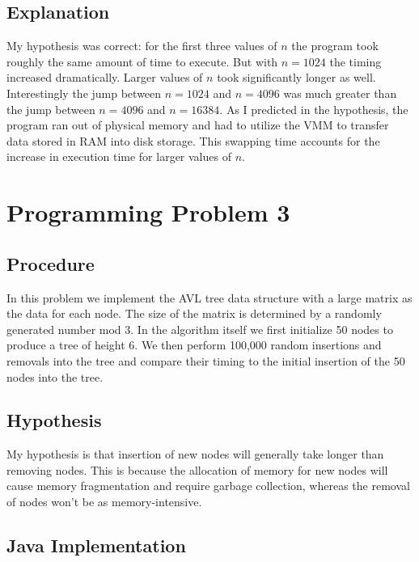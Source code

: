 \documentclass[11pt]{article}
\begin{document}
\subsection*{Explanation}

My hypothesis was correct: for the first three values of $n$ the program took roughly the same amount of time to execute. But with $n=1024$ the timing increased dramatically. Larger values of $n$ took significantly longer as well. Interestingly the jump between $n=1024$ and $n=4096$ was much greater than the jump between $n=4096$ and $n=16384$. As I predicted in the hypothesis, the program ran out of physical memory and had to utilize the VMM to transfer data stored in RAM into disk storage. This swapping time accounts for the increase in execution time for larger values of $n$.

\section*{Programming Problem 3}

\subsection*{Procedure}

In this problem we implement the AVL tree data structure with a large matrix as the data for each node. The size of the matrix is determined by a randomly generated number mod 3. In the algorithm itself we first initialize 50 nodes to produce a tree of height 6. We then perform 100,000 random insertions and removals into the tree and compare their timing to the initial insertion of the 50 nodes into the tree.

\subsection*{Hypothesis}

My hypothesis is that insertion of new nodes will generally take longer than removing nodes. This is because the allocation of memory for new nodes will cause memory fragmentation and require garbage collection, whereas the removal of nodes won't be as memory-intensive. 

\subsection*{Java Implementation}
\end{document}
